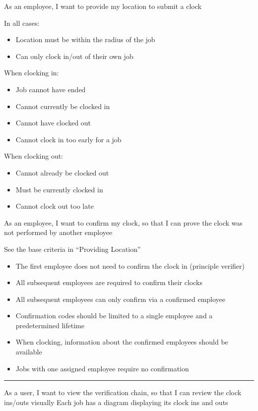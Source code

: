 {
  As an employee, I want to provide my location to submit
  a clock
}
{
  In all cases:
  \begin{itemize}
    \item Location must be within the radius of the job
    \item Can only clock in/out of their own job
  \end{itemize}

  When clocking in:
  \begin{itemize}
    \item Job cannot have ended
    \item Cannot currently be clocked in
    \item Cannot have clocked out
    \item Cannot clock in too early for a job
  \end{itemize}

  When clocking out:
  \begin{itemize}
    \item Cannot already be clocked out
    \item Must be currently clocked in
    \item Cannot clock out too late
  \end{itemize}
}

{
  As an employee, I want to confirm my clock, so that I can
  prove the clock was not performed by another employee
}
{
  See the base criteria in \enquote{Providing Location}

  \begin{itemize}
    \item The first employee does not need to confirm the
          clock in (principle verifier)
    \item All subsequent employees are required to confirm
          their clocks
    \item All subsequent employees can only confirm via a
          confirmed employee
    \item Confirmation codes should be limited to a single
          employee and a predetermined lifetime
    \item When clocking, information about the confirmed
          employees should be available
    \item Jobs with one assigned employee require no
          confirmation
  \end{itemize}
} \hrule

{
  As a user, I want to view the verification chain, so that
  I can review the clock ins/outs visually
}
{
  Each job has a diagram displaying its clock ins and outs
}
